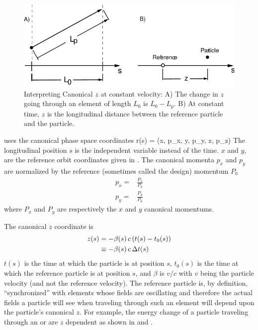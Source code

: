 \begin{figure}
\centering 
\includegraphics{canonical-z.pdf} 
\caption[Interpreting Canonical $z$ at constant velocity.]
{Interpreting Canonical $z$ at constant velocity: A) The change in $z$
going through an element of length $L_0$ is $L_0 - L_p$.  B) At
constant time, $z$ is the longitudinal distance between the reference
particle and the particle.}
\label{f:canonical.z}
\end{figure}

\bmad uses the canonical phase space coordinates 
\Begineq
  \Bf r(s) = (x, p_x, y, p_y, z, p_z)
\Endeq
The longitudinal position $s$ is the independent variable instead of
the time.  $x$ and $y$, are the reference orbit coordinates given in
.  The canonical momenta $p_x$ and $p_y$ are
normalized by the reference (sometimes called the
design) momentum $P_0$
\begin{align}
  p_x = &\frac{P_x}{P_0} \\
  p_y = &\frac{P_y}{P_0}
\end{align}
where $P_x$ and $P_y$ are respectively the $x$ and $y$ canonical momentums.

The canonical $z$ coordinate is 
\begin{align}
  z(s) &= -\beta(s) \, c \, (t(s) - t_0(s)) \nonumber \\
    &\equiv - \beta(s) \, c \, \Delta t(s)
  \label{zbctt}
\end{align}
$t(s)$ is the time at which the particle is at position $s$, $t_0(s)$
is the time at which the reference particle is at position $s$, and
$\beta$ is $v/c$ with $v$ being the particle velocity (and not the
reference velocity). The reference particle is, by definition,
``synchronized'' with elements whose fields are oscillating and therefore the
actual fields a particle will see when traveling through such an
element will depend upon the particle's canonical $z$. For example,
the energy change of a particle traveling through an  or
 are $z$ dependent as shown in  and .

